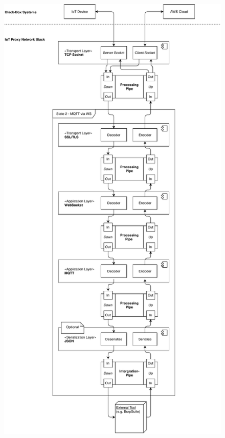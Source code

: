 \begin{figure}[t]
    \centering
    \includegraphics[width=12cm]{img/ch04/Architecture - PipesFilters 2.pdf}
    \label{fig:app-diag-pipesfilters-2}
\end{figure}


